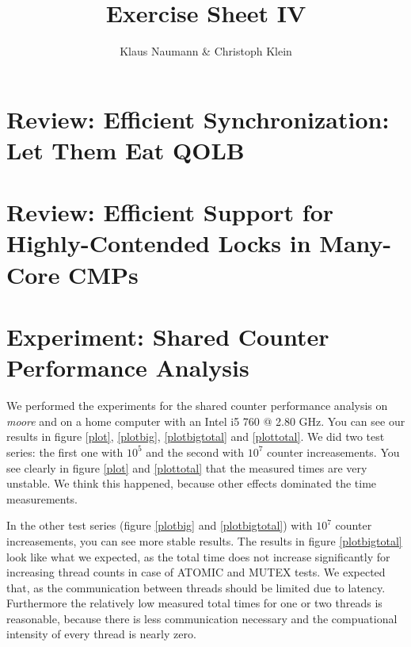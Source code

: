 \documentclass[oneside,a4paper]{scrartcl}
\begin{document}

\title{Exercise Sheet IV}
\subject{Advanced Parallel Computing}
\author{Klaus Naumann \& Christoph Klein}
\maketitle




\section{Review: Efficient Synchronization: Let Them Eat QOLB}


\section{Review: Efficient Support for Highly-Contended Locks in Many-Core CMPs}

    

\section{Experiment: Shared Counter Performance Analysis}
We performed the experiments for the shared counter performance
analysis on \emph{moore} and on a home computer with an Intel
i5 760 @ 2.80 GHz. You can see our results in figure \ref{plot}, \ref{plotbig},
\ref{plotbigtotal} and \ref{plottotal}. We did two test series: the first
one with $10^5$ and the second with $10^7$ counter increasements. You
see clearly in figure \ref{plot} and \ref{plottotal} that the measured
times are very unstable. We think this happened, because other effects
dominated the time measurements. 

In the other test series (figure \ref{plotbig} and \ref{plotbigtotal}) with
$10^7$ counter increasements, you can see more stable results. The results
in figure \ref{plotbigtotal} look like what we expected, as the total
time does not increase significantly for increasing thread counts
in case of ATOMIC and MUTEX tests.
We expected that, as the communication between threads should be
limited due to latency. Furthermore the relatively low measured total
times for one or two threads is reasonable, because there is less
communication necessary and the compuational intensity of every thread
is nearly zero.
\end{document}
